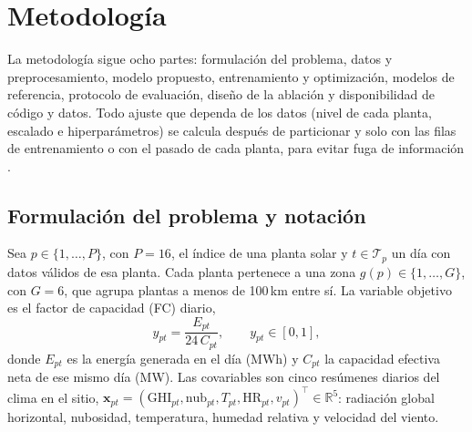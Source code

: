 \documentclass[pdflatex,sn-mathphys-num]{sn-jnl}
\begin{document}
\section{Metodología}\label{sec:metodologia}

La metodología sigue ocho partes: formulación del problema, datos y preprocesamiento, modelo propuesto, entrenamiento y optimización, modelos de referencia, protocolo de evaluación, diseño de la ablación y disponibilidad de código y datos. Todo ajuste que dependa de los datos (nivel de cada planta, escalado e hiperparámetros) se calcula después de particionar y solo con las filas de entrenamiento o con el pasado de cada planta, para evitar fuga de información \cite{kaufman2012leakage}.


\subsection{Formulación del problema y notación}\label{subsec:formulacion}

Sea $p \in \{1,\dots,P\}$, con $P=16$, el índice de una planta solar y $t \in \mathcal{T}_p$ un día con datos válidos de esa planta. Cada planta pertenece a una zona $g(p) \in \{1,\dots,G\}$, con $G=6$, que agrupa plantas a menos de 100\,km entre sí. La variable objetivo es el factor de capacidad (FC) diario,
\begin{equation}
y_{pt} = \frac{E_{pt}}{24\, C_{pt}}, \qquad y_{pt} \in [0,1],
\label{eq:fc}
\end{equation}
donde $E_{pt}$ es la energía generada en el día (MWh) y $C_{pt}$ la capacidad efectiva neta de ese mismo día (MW). Las covariables son cinco resúmenes diarios del clima en el sitio, $\mathbf{x}_{pt} = (\text{GHI}_{pt}, \text{nub}_{pt}, T_{pt}, \text{HR}_{pt}, v_{pt})^\top \in \mathbb{R}^5$: radiación global horizontal, nubosidad, temperatura, humedad relativa y velocidad del viento.
\end{document}
